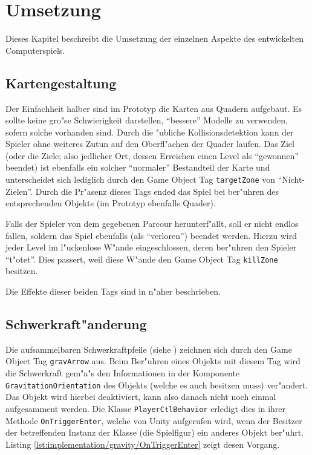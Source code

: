 \section{Umsetzung}
\label{sec:implementation}
%
Dieses Kapitel beschreibt die Umsetzung der einzelnen Aspekte des
entwickelten Computerspiels.
%
\subsection{Kartengestaltung}
\label{sec:implementation/maps}
%
Der Einfachheit halber sind im Prototyp die Karten aus Quadern aufgebaut.
Es sollte keine gro"se Schwierigkeit darstellen, ``bessere'' Modelle
zu verwenden, sofern solche vorhanden sind. Durch die "ubliche Kollisionsdetektion
kann der Spieler ohne weiteres Zutun auf den Oberfl"achen der Quader laufen.
Das Ziel (oder die Ziele; also jedlicher Ort, dessen Erreichen einen Level als
``gewonnen'' beendet) ist ebenfalls ein solcher ``normaler'' Bestandteil der Karte
und unterscheidet sich lediglich durch den Game Object Tag \texttt{targetZone}
von ``Nicht-Zielen''. Durch die Pr"asenz dieses Tags ended das Spiel bei
ber"uhren des entsprechenden Objekts (im Prototyp ebenfalls Quader).

Falls der Spieler von dem gegebenen Parcour herunterf"allt, soll er nicht
endlos fallen, soldern das Spiel ebenfalls (als ``verloren'') beendet
werden. Hierzu wird jeder Level im l"uckenlose W"ande eingeschlossen,
deren ber"uhren den Spieler ``t"otet''. Dies passert, weil diese W"ande
den Game Object Tag \texttt{killZone} besitzen.

Die Effekte dieser beiden Tags sind in 
n"aher beschrieben.
%
\subsection{Schwerkraft"anderung}
\label{sec:implementation/gravity}
%
Die aufsammelbaren Schwerkraftpfeile (siehe )
zeichnen sich durch den Game Object Tag \texttt{gravArrow} aus. Beim Ber"uhren
eines Objekts mit diesem Tag wird die Schwerkraft gem"a"s den Informationen in
der Komponente \texttt{GravitationOrientation} des Objekts (welche es auch
besitzen muss) ver"andert. Das Objekt wird hierbei deaktiviert, kann also danach
nicht noch einmal aufgesamment werden. Die Klasse \texttt{PlayerCtlBehavior}
erledigt dies in ihrer Methode \texttt{OnTriggerEnter}, welche von Unity
aufgerufen wird, wenn der Besitzer der betreffenden Instanz der Klasse (die
Spielfigur) ein anderes Objekt ber"uhrt. Listing
\ref{lst:implementation/gravity/OnTriggerEnter} zeigt desen Vorgang.

